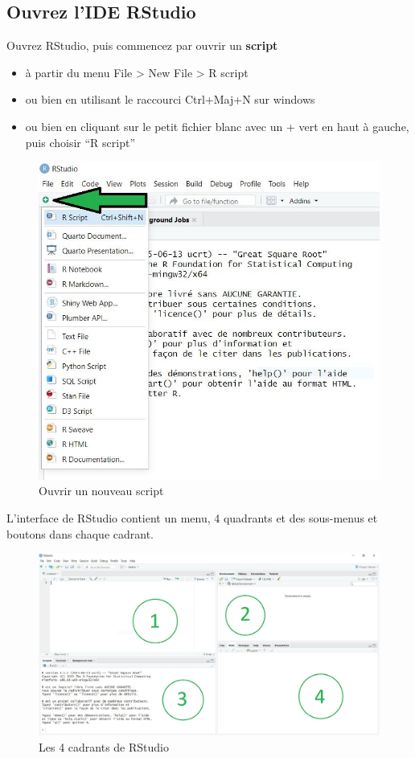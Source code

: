 \documentclass[
]{book}
\providecommand{\tightlist}{%
  \setlength{\itemsep}{0pt}\setlength{\parskip}{0pt}}
\begin{document}
\subsection{Ouvrez l'IDE RStudio}\label{ouvrez-lide-rstudio}

Ouvrez RStudio, puis commencez par ouvrir un \textbf{script}

\begin{itemize}
\tightlist
\item
  à partir du menu File \textgreater{} New File \textgreater{} R script
\item
  ou bien en utilisant le raccourci Ctrl+Maj+N sur windows
\item
  ou bien en cliquant sur le petit fichier blanc avec un + vert en haut à gauche, puis choisir ``R script''
\end{itemize}

\begin{figure}

{\centering \includegraphics[width=0.5\linewidth]{./images/newscriptR} 

}

\caption{Ouvrir un nouveau script}\label{fig:newscript}
\end{figure}

L'interface de RStudio contient un menu, 4 quadrants et des sous-menus et boutons dans chaque cadrant.

\begin{figure}

{\centering \includegraphics[width=1\linewidth]{./images/cadrants_RStudio} 

}

\caption{Les 4 cadrants de RStudio}\label{fig:RStudcadrants}
\end{figure}
\end{document}
